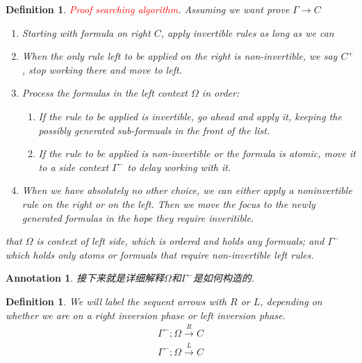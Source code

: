 \documentclass{article}
\theoremstyle{plain}
\newtheorem{definition}[theorem]{Definition}
\newtheorem{annotation}[theorem]{Annotation}
\theoremstyle{nonumberplain}
\newcommand{\redt}[1]{\textcolor{red}{#1}}
\begin{document}
\begin{definition}
\rm \redt{Proof searching algorithm}. Assuming we want prove $\Gamma \to C$
\begin{enumerate}
	\item Starting with formula on right $C$, apply invertible rules as long as we can
	\item When the only rule left to be applied on the right is non-invertible, we say $C^+$, stop working there and move to left.
	\item Process the formulas in the left context $\Omega$ in order:
	\begin{enumerate}
		\item If the rule to be applied is invertible, go ahead and apply it, keeping the possibly generated sub-formuals in the front of the list.
		\item If the rule to be applied is non-invertible or the formula is atomic, move it to a side context $\Gamma^-$ to delay working with it. 
	\end{enumerate}
	\item When we have absolutely no other choice, we can either apply a noninvertible rule on the right or on the left. Then we move the focus to the newly generated formulas in the hope they require inveritible.
\end{enumerate}
that $\Omega$ is context of left side, which is ordered and holds any formuals; and $\Gamma^-$ which holds only atoms or formuals that require non-invertible left rules.  
\end{definition}

\begin{annotation}
\rm 接下来就是详细解释$\Omega$和$\Gamma^-$是如何构造的.
\end{annotation}

\begin{definition}
\rm We will label the sequent arrows with $R$ or $L$, depending on whether we are on a right inversion phase or left inversion phase.
$$
\begin{gathered}
\Gamma^-;\Omega \xrightarrow{R} C \\
\Gamma^-;\Omega \xrightarrow{L} C \\
\end{gathered}
$$
\end{definition}
\end{document}
